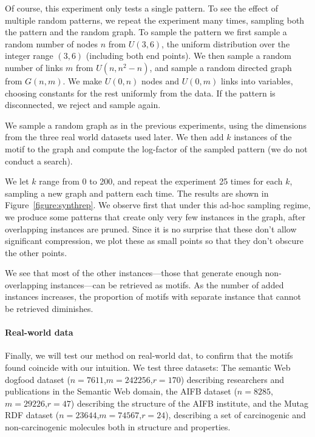 \documentclass[letterpaper]{article} %
\begin{document}
Of course, this experiment only tests a single pattern. To see the effect of multiple random patterns, we repeat the experiment many times, sampling both the pattern and the random graph. 
To sample the pattern we first sample a random number of nodes $n$ from $U(3, 6)$, the uniform distribution over the integer range $(3, 6)$ (including both end points). We then sample a random number of links $m$ from $U(n, n^2 - n)$, and sample a random directed graph from $G(n, m)$. We make $U(0, n)$ nodes and $U(0, m)$ links into variables, choosing constants for the rest uniformly from the data. If the pattern is disconnected, we reject and sample again.

We sample a random graph as in the previous experiments, using the dimensions from the three real world datasets used later. We then add $k$ instances of the motif to the graph and compute the log-factor of the sampled pattern (we do not conduct a search).

We let $k$ range from 0 to 200, and repeat the experiment 25 times for each $k$, sampling a new graph and pattern each time. The results are shown in Figure~\ref{figure:synthrep}. We observe first that under this ad-hoc sampling regime, we produce some patterns that create only very few instances in the graph, after overlapping instances are pruned. Since it is no surprise that these don't allow significant compression, we plot these as small points so that they don't obscure the other points. 

We see that most of the other instances---those that generate enough non-overlapping instances---can be retrieved as motifs. As the number of added instances increases, the proportion of motifs with separate instance that cannot be retrieved diminishes.


\paragraph{Real-world data} Finally, we will test our method on real-world dat, to confirm that the motifs found coincide with our intuition. We test three datasets: The semantic Web dogfood dataset \cite{moller2007recipes} ($n=7611$,$m=242256$,$r=170$) describing researchers and publications in the Semantic Web domain, the AIFB dataset \cite{bloehdorn2007kernel} ($n=8285$,$m=29226$,$r=47$) describing the structure of the AIFB institute, and the Mutag RDF dataset \footnotemark ($n=23644$,$m=74567$,$r=24$), describing a set of carcinogenic and non-carcinogenic molecules both in structure and properties.
\end{document}
